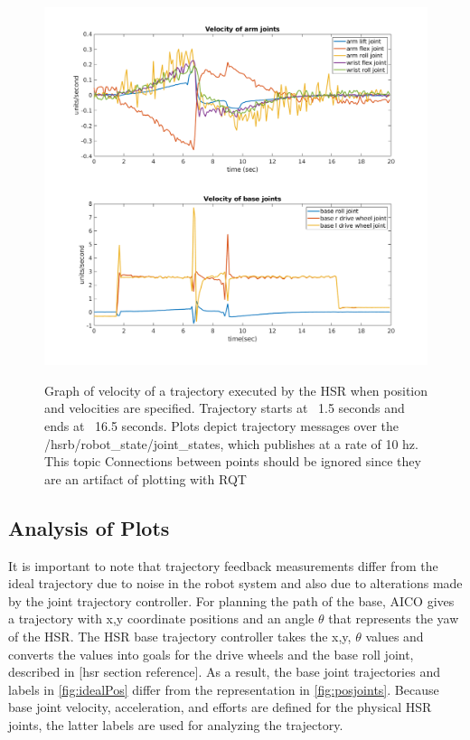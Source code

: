 \documentclass[11pt]{article}
\begin{document}
        \begin{figure}
            \centering
            \includegraphics[width=\linewidth]{2020.04.01/vel_joints.png}
            \label{fig:veljoints}
            \caption{Graph of velocity of a trajectory executed by the HSR when position and velocities are specified. Trajectory starts at ~1.5 seconds and ends at ~16.5 seconds. Plots depict trajectory messages over the /hsrb/robot\_state/joint\_states, which publishes at a rate of 10 hz. This topic Connections between points should be ignored since they are an artifact of plotting with RQT}
        \end{figure}
        


    \subsection{Analysis of Plots}
        It is important to note that trajectory feedback measurements differ from the ideal trajectory due to noise in the robot system and also due to alterations made by the joint trajectory controller. 
        For planning the path of the base, AICO gives a trajectory with x,y coordinate positions and an angle \(\theta\) that represents the yaw of the HSR. The HSR base trajectory controller takes the x,y, \(\theta\) values and converts the values into goals for the drive wheels and the base roll joint, described in [hsr section reference]. As a result, the base joint trajectories and labels in \cref{fig:idealPos} differ from the representation in \cref{fig:posjoints}. Because base joint velocity, acceleration, and efforts are defined for the physical HSR joints, the latter labels are used for analyzing the trajectory.
\end{document}
